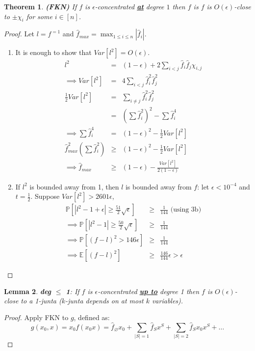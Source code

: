 \documentclass{sig-alternate}
\newtheorem{theorem}{Theorem}[section]
\newtheorem{lemma}[theorem]{Lemma}
\begin{document}
\begin{theorem}{\bf (FKN)}
If $f$ is $\epsilon$-concentrated \underline{\textbf{at}} degree $1$ then $f$ is $f$ is $O(\epsilon)$-close to $\pm\chi_i$ for some $i \in [n]$.
\end{theorem}
\begin{proof}
Let $l = f^{=1}$ and $\hat{f}_{max} = \max_{1 \leq i \leq n}|\hat{f}_i|$.
\begin{enumerate} 
\item It is enough to show that $Var[l^2] = O(\epsilon)$.
	\begin{eqnarray*}
	l^2 & = & (1-\epsilon) + 2\sum_{i < j}\hat{f}_i\hat{f}_j\chi_{i,j} \\
	\implies Var[l^2] & = & 4\sum_{i < j}\hat{f}^2_i\hat{f}^2_j \\
	\frac{1}{2}Var[l^2] & = & \sum_{i \neq j}\hat{f}^2_i\hat{f}^2_j \\
	& = & (\sum \hat{f}^2_i)^2 - \sum\hat{f}^4_i \\
	\implies \sum\hat{f}^4_i & = & (1-\epsilon)^2 - \frac{1}{2}Var[l^2] \\
	\hat{f}_{max}^2(\sum \hat{f}^2_i) & \geq & (1 - \epsilon)^2 - \frac{1}{2}Var[l^2] \\
	\implies \hat{f}_{max} & \geq & (1 - \epsilon) - \frac{Var[l^2]}{2(1 - \epsilon)}
	\end{eqnarray*}
\item If $l^2$ is bounded away from 1, then $l$ is bounded away from $f$: let $\epsilon < 10^{-4}$ and $t = \frac{1}{2}$. Suppose $Var[l^2] > 2601\epsilon$, \begin{eqnarray*}
	\mathbb{P}[|l^2 - 1 + \epsilon| \geq \frac{51}{2}\sqrt{\epsilon}] & \geq & \frac{1}{144}  \mbox{ (using 3b)}\\
	\implies \mathbb{P}[|l^2 - 1| \geq \frac{50}{2}\sqrt{\epsilon}] & \geq & \frac{1}{144} \\
	\implies \mathbb{P}[(f - l)^2 > 146\epsilon] & \geq & \frac{1}{144} \\
	\implies \mathbb{E}[(f-l)^2] & \geq & \frac{146}{144}\epsilon > \epsilon
	\end{eqnarray*}
\end{enumerate}
\end{proof}

\begin{lemma}
\textit{\textbf{deg $\leq$ 1}}: If $f$ is $\epsilon$-concentrated \underline{\textbf{up to}} degree 1 then $f$ is $O(\epsilon)$-close to a 1-junta ($k$-junta depends on at most $k$ variables).
\end{lemma}
\begin{proof} Apply FKN to $g$, defined as:
\[g(x_0,x) = x_0f(x_0x) = \hat{f}_{\varnothing}x_0 + \sum_{|S| = 1}\hat{f}_Sx^{S} + \sum_{|S| = 2}\hat{f}_Sx_0x^S + \ldots\]
\end{proof}
\end{document}
